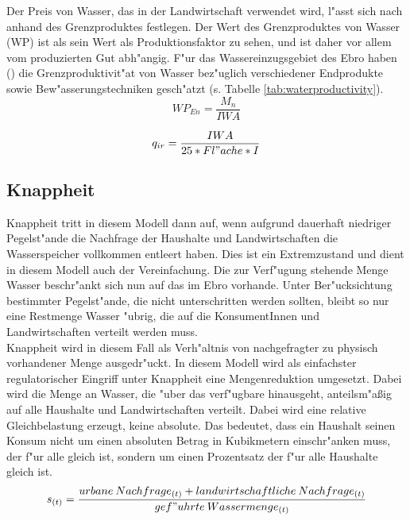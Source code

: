 \documentclass[11pt,a4paper]{article}
\begin{document}
Der Preis von Wasser, das in der Landwirtschaft verwendet wird, l"asst sich nach \cite{George2011a} anhand des Grenzproduktes festlegen. Der Wert des Grenzproduktes von Wasser (WP) ist als sein Wert als Produktionsfaktor zu sehen, und ist daher vor allem vom produzierten Gut abh"angig. F"ur das Wassereinzugsgebiet des Ebro haben (\cite{Salvador2011}) die Grenzproduktivit"at von Wasser bez"uglich verschiedener Endprodukte sowie Bew"asserungstechniken gesch"atzt (s. Tabelle \ref{tab:waterproductivity}).\\

\begin{dmath}
WP_{En} = \frac{M_{n}}{IWA}
\label{eq:waterproductivity}
\end{dmath}

\begin{dmath}
q_{ir} = \frac{IWA}{25 * Fl"ache * I}
\label{eq:irrigation-demand-function}
\end{dmath}

\subsection{Knappheit}
\label{Knappheitsfunktion}

Knappheit tritt in diesem Modell dann auf, wenn aufgrund dauerhaft nie\-drig\-er Pegelst"ande die Nachfrage der Haushalte und Landwirtschaften die Wasserspeicher vollkommen entleert haben. Dies ist ein Extremzustand und dient in diesem Modell auch der Vereinfachung. Die zur Verf"ugung stehende Menge Wasser beschr"ankt sich nun auf das im Ebro vorhande. Unter Ber"ucksichtung bestimmter Pegelst"ande, die nicht unterschritten werden sollten, bleibt so nur eine Restmenge Wasser "ubrig, die auf die KonsumentInnen und Landwirtschaften verteilt werden muss.\\
Knappheit wird in diesem Fall als Verh"altnis von nachgefragter zu phy\-sisch vorhandener Menge ausgedr"uckt. In diesem Modell wird als einfachster regulatorischer Eingriff unter Knappheit eine Mengenreduktion umgesetzt. Dabei wird die Menge an Wasser, die "uber das verf"ugbare hinausgeht, anteilsm"aßig auf alle Haushalte und Landwirtschaften verteilt. Dabei wird eine relative Gleichbelastung erzeugt, keine absolute. Das bedeutet, dass ein Haushalt seinen Konsum nicht um einen absoluten Betrag in Kubikmetern einschr"anken muss, der f"ur alle gleich ist, sondern um einen Prozentsatz der f"ur alle Haushalte gleich ist.\\

\begin{dmath}
s_{(t)} = \frac{urbane\:Nachfrage_{(t)} + landwirtschaftliche\:Nachfrage_{(t)}}{gef"uhrte\:Wassermenge_{(t)}}
\label{eq:scarcity-function}
\end{dmath}
\end{document}

